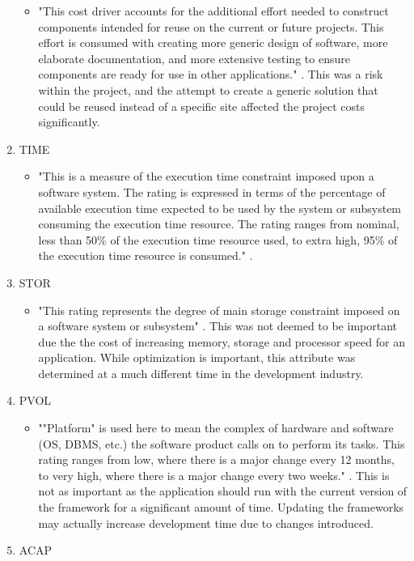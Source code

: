 \begin{enumerate}
\begin{itemize}
\item "This cost driver accounts for the additional effort needed to construct components intended for reuse on the current or future projects. This effort is consumed with creating more generic design of software, more elaborate documentation, and more extensive testing to ensure components are ready for use in other applications." \parencite{coco}. This was a risk within the project, and the attempt to create a generic solution that could be reused instead of a specific site affected the project costs significantly. 
\end{itemize}
\item TIME
\begin{itemize}
\item "This is a measure of the execution time constraint imposed upon a software system. The rating is expressed in terms of the percentage of available execution time expected to be used by the system or subsystem consuming the execution time resource. The rating ranges from nominal, less than 50\% of the execution time resource used, to extra high, 95\% of the execution time resource is consumed." \parencite{coco}.
\end{itemize}
\item STOR
\begin{itemize}
\item "This rating represents the degree of main storage constraint imposed on a software system or subsystem" \parencite{coco}. This was not deemed to be important due the the cost of increasing memory, storage and processor speed for an application. While optimization is important, this attribute was determined at a much different time in the development industry. 
\end{itemize}
\item PVOL
\begin{itemize}
\item ""Platform" is used here to mean the complex of hardware and software (OS, DBMS, etc.) the software product calls on to perform its tasks. This rating ranges from low, where there is a major change every 12 months, to very high, where there is a major change every two weeks." \parencite{coco}. This is not as important as the application should run with the current version of the framework for a significant amount of time. Updating the frameworks may actually increase development time due to changes introduced. 
\end{itemize}
\item ACAP
\begin{itemize}

\end{itemize}
\end{enumerate}
